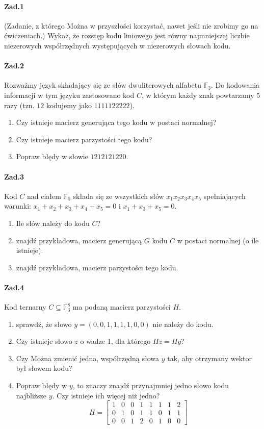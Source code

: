 \documentclass[a4paper,12pt]{article}
\theoremstyle{definition}%
\theoremstyle{definition}
\theoremstyle{problem}
\begin{document}
\paragraph{Zad.1} (Zadanie, z którego Można w przyszłości korzystać, nawet jeśli nie zrobimy go na ćwiczeniach.) Wykaż, że rozstęp kodu liniowego jest równy najmniejszej liczbie niezerowych współrzędnych występujących w niezerowych słowach kodu.

\paragraph{Zad.2} Rozważmy język składający się ze słów dwuliterowych alfabetu $\mathbb{F}_3$. Do kodowania informacji w tym języku zastosowano kod $C$, w którym każdy znak powtarzamy $5$ razy (tzn. $12$ kodujemy jako $1111122222$).
\begin{enumerate}[label=\alph*)]
\item Czy istnieje macierz generująca tego kodu w postaci normalnej?
\item Czy istnieje macierz parzystości tego kodu?
\item Popraw błędy w słowie $1212121220$.
\end{enumerate}


\paragraph{Zad.3} Kod $C$ nad ciałem $\mathbb{F}_5$ składa się
ze wszystkich słów $x_1x_2x_3x_4x_5$ spełniających warunki:
$x_1 + x_2 + x_3 + x_4 + x_5 = 0$ i $x_1 + x_3 + x_5 = 0$.
\begin{enumerate}[label=\alph*)]
\item Ile słów należy do kodu $C$?
\item znajdź przykładowa, macierz generującą $G$ kodu $C$ w postaci normalnej (o ile istnieje).
\item znajdź przykładowa, macierz parzystości tego kodu.
\end{enumerate}

\paragraph{Zad.4} Kod ternarny $C\subseteq \mathbb{F}_3^8$ ma podaną macierz parzystości $H$.
\begin{enumerate}[label=\alph*)]
\item sprawdź, że słowo $y = (0, 0, 1, 1, 1, 1, 0, 0)$ nie należy do kodu.
\item Czy istnieje słowo $z$ o wadze 1, dla którego $Hz = Hy$?
\item Czy Można zmienić jedna, współrzędną słowa $y$ tak, aby otrzymany wektor był słowem kodu?
\item Popraw błędy w $y$, to znaczy znajdź przynajmniej jedno słowo kodu najbliższe $y$. Czy istnieje ich więcej niż jedno?
$$H =\begin{bmatrix}
1& 0& 0& 1& 1& 1& 1& 2\\
0& 1& 0& 1& 1& 0& 1& 1\\
0& 0& 1& 2& 0& 1& 0& 0
\end{bmatrix}$$
\end{enumerate}
\end{document}
